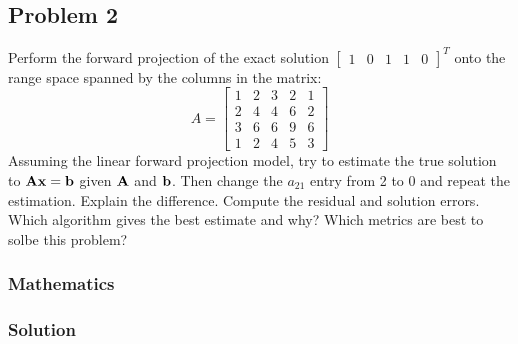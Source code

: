 \subsection{Problem 2}%
\label{sec:problem_2}
Perform the forward projection of the exact solution
$\begin{bmatrix} 1 & 0 & 1 & 1 & 0 \end{bmatrix}^T$
onto the range space spanned by the columns in the matrix:
\begin{equation*}
    A = \begin{bmatrix}
        1 & 2 & 3 & 2 & 1 \\
        2 & 4 & 4 & 6 & 2 \\
        3 & 6 & 6 & 9 & 6 \\
        1 & 2 & 4 & 5 & 3
\end{bmatrix}
\end{equation*}
Assuming the linear forward projection model, try to estimate the true solution to
$\mathbf{Ax} = \mathbf{b}$ given $\mathbf{A}$ and $\mathbf{b}$.
Then change the $a_{21}$ entry from 2 to 0 and repeat the estimation.
Explain the difference.
Compute the residual and solution errors.
Which algorithm gives the best estimate and why?
Which metrics are best to solbe this problem?
\subsubsection*{Mathematics}
\subsubsection*{Solution}
